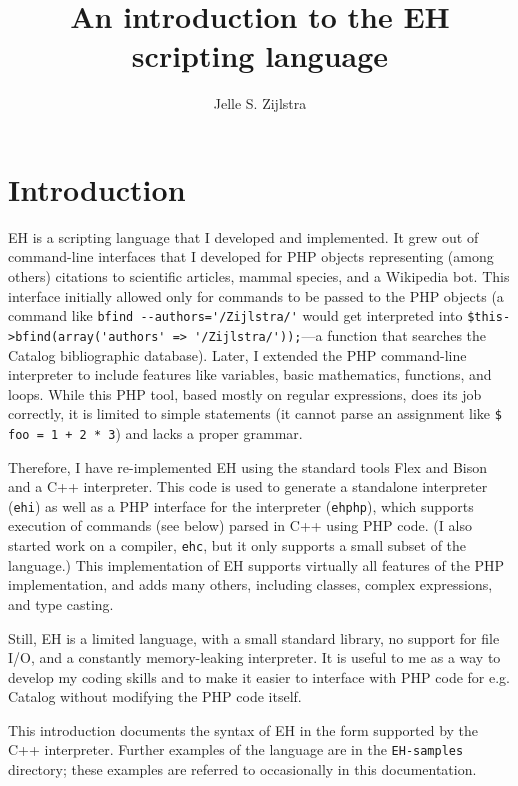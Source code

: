 \documentclass{article}
\begin{document}
\title{An introduction to the EH scripting language}
\author{Jelle S. Zijlstra}
\maketitle
\tableofcontents
\pagebreak
\section{Introduction}
EH is a scripting language that I developed and implemented. 
It grew out of command-line interfaces that I developed for PHP objects representing (among others) citations to scientific articles, mammal species, and a Wikipedia bot. 
This interface initially allowed only for commands to be passed to the PHP objects (a command like \verb#bfind --authors='/Zijlstra/'# would get interpreted into \verb#$this->bfind(array('authors' => '/Zijlstra/'));#---a function that searches the Catalog bibliographic database). 
Later, I extended the PHP command-line interpreter to include features like variables, basic mathematics, functions, and loops. 
While this PHP tool, based mostly on regular expressions, does its job correctly, it is limited to simple statements (it cannot parse an assignment like \verb#$ foo = 1 + 2 * 3#) and lacks a proper grammar.

Therefore, I have re-implemented EH using the standard tools Flex and Bison and a C++ interpreter. 
This code is used to generate a standalone interpreter (\verb#ehi#) as well as a PHP interface for the interpreter (\verb#ehphp#), which supports execution of commands (see below) parsed in C++ using PHP code. 
(I also started work on a compiler, \verb#ehc#, but it only supports a small subset of the language.) 
This implementation of EH supports virtually all features of the PHP implementation, and adds many others, including classes, complex expressions, and type casting.

Still, EH is a limited language, with a small standard library, no support for file I/O, and a constantly memory-leaking interpreter. 
It is useful to me as a way to develop my coding skills and to make it easier to interface with PHP code for e.g. Catalog without modifying the PHP code itself.

This introduction documents the syntax of EH in the form supported by the C++ interpreter.
Further examples of the language are in the \verb#EH-samples# directory; these examples are referred to occasionally in this documentation.
\end{document}
